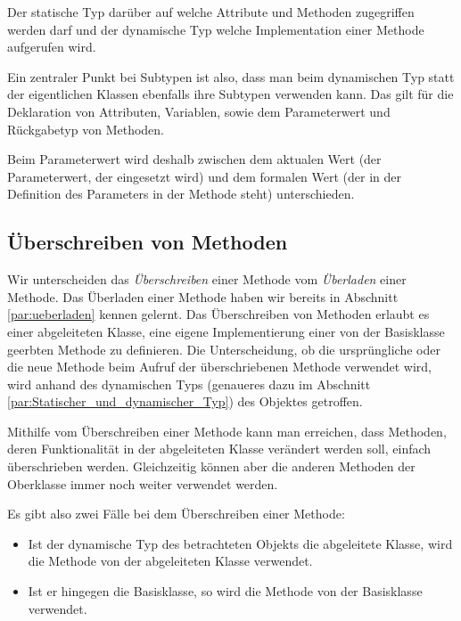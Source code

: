 \documentclass{tuda-pub}
\begin{document}
  \br

  Der statische Typ darüber auf welche Attribute und Methoden zugegriffen werden darf und der
  dynamische Typ welche Implementation einer Methode aufgerufen wird.

  \br
  \begin{note}[title=Information:]
    Ein zentraler Punkt bei Subtypen ist also, dass man beim dynamischen Typ statt der
    eigentlichen Klassen ebenfalls ihre Subtypen verwenden kann. Das gilt für die Deklaration von
    Attributen, Variablen, sowie dem Parameterwert und Rückgabetyp von Methoden.

    \br

    Beim Parameterwert wird deshalb zwischen dem aktualen Wert (der Parameterwert, der eingesetzt
    wird) und dem formalen Wert (der in der Definition des Parameters in der Methode steht)
    unterschieden.
  \end{note}

  \subsection{Überschreiben von Methoden}

  Wir unterscheiden das \emph{Überschreiben} einer Methode vom \emph{Überladen} einer Methode.
  Das Überladen einer Methode haben wir bereits in Abschnitt \ref{par:ueberladen} kennen gelernt.
  Das Überschreiben von Methoden erlaubt es einer abgeleiteten Klasse, eine eigene
  Implementierung einer von der Basisklasse geerbten Methode zu definieren. Die Unterscheidung,
  ob die ursprüngliche oder die neue Methode beim Aufruf der überschriebenen Methode verwendet
  wird, wird anhand des dynamischen Typs (genaueres dazu im Abschnitt
  \ref{par:Statischer_und_dynamischer_Typ}) des Objektes getroffen.

  \br

  Mithilfe vom Überschreiben einer Methode kann man erreichen, dass Methoden, deren
  Funktionalität in der abgeleiteten Klasse verändert werden soll, einfach überschrieben werden.
  Gleichzeitig können aber die anderen Methoden der Oberklasse immer noch weiter verwendet werden.

  \begin{note}[title=Information:]
    Es gibt also zwei Fälle bei dem Überschreiben einer Methode:

    \begin{itemize}
      \item Ist der dynamische Typ des betrachteten Objekts die abgeleitete Klasse, wird die
      Methode von der abgeleiteten Klasse verwendet.
      \item Ist er hingegen die Basisklasse, so wird die Methode von der Basisklasse verwendet.
    \end{itemize}
  \end{note}
\end{document}
